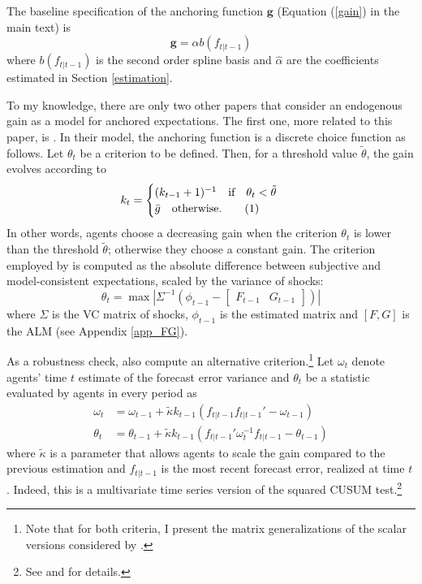 \documentclass[11pt]{article}
\renewcommand{\[}{\begin{equation}}
\renewcommand{\]}{\end{equation}}
\newcommand\numberthis{\addtocounter{equation}{1}\tag{\theequation}} %
\begin{document}
The baseline specification of the anchoring function $\mathbf{g}$ (Equation (\ref{gain}) in the main text) is \begin{equation}
\mathbf{g} = \alpha b(f_{t|t-1})
\end{equation}
where $ b(f_{t|t-1})$ is the second order spline basis and $\hat{\alpha}$ are the coefficients estimated in Section \ref{estimation}.

To my knowledge, there are only two other papers that consider an endogenous gain as a model for anchored expectations. The first one, more related to this paper, is \cite{carvalho2019anchored}. In their model, the anchoring function is a discrete choice function as follows. Let $\theta_t$ be a criterion to be defined. Then, for a threshold value $\tilde{\theta}$, the gain evolves according to
\begin{align*}
k_t & = \begin{cases} (k_{t-1}+1)^{-1} \quad \text{if} \quad \theta_t < \tilde{\theta}  \\ \bar{g}  \quad \text{otherwise.}\numberthis \label{anchoring_kinked}
\end{cases} 
\end{align*}
In other words, agents choose a decreasing gain when the criterion $\theta_t$ is lower than the threshold $\tilde{\theta}$; otherwise they choose a constant gain. The criterion employed by \cite{carvalho2019anchored} is computed as the absolute difference between subjective and model-consistent expectations, scaled by the variance of shocks:
\begin{equation}
\theta_t = \max | \Sigma^{-1} ( \phi_{t-1} - \begin{bmatrix} F_{t-1} & G_{t-1} \end{bmatrix}) |
\end{equation}
where $\Sigma$ is the VC matrix of shocks, $\phi_{t-1}$ is the estimated matrix and $[F,G]$ is the ALM (see Appendix \ref{app_FG}).

As a robustness check, \cite{carvalho2019anchored} also compute an alternative criterion.\footnote{Note that for both criteria, I present the matrix generalizations of the scalar versions considered by \cite{carvalho2019anchored}.} Let $\omega_t$ denote agents' time $t$ estimate of the forecast error variance and $\theta_t$ be a statistic evaluated by agents in every period as
\begin{align}
\omega_t & =  \omega_{t-1} + \tilde{\kappa} k_{t-1}(f_{t|t-1} f_{t|t-1}'  -\omega_{t-1})\\
\theta_t & =  \theta_{t-1} + \tilde{\kappa} k_{t-1}(f_{t|t-1}'\omega_t^{-1}f_{t|t-1} -\theta_{t-1}) \label{cusum_crit}
\end{align}
where $\tilde{\kappa}$ is a parameter that allows agents to scale the gain compared to the previous estimation and $f_{t|t-1}$ is the most recent forecast error, realized at time $t$. Indeed, this is a multivariate time series version of the squared CUSUM test.\footnote{See \cite{brown1975techniques} and \cite{lutkepohl2013introduction} for details.}
\end{document}

